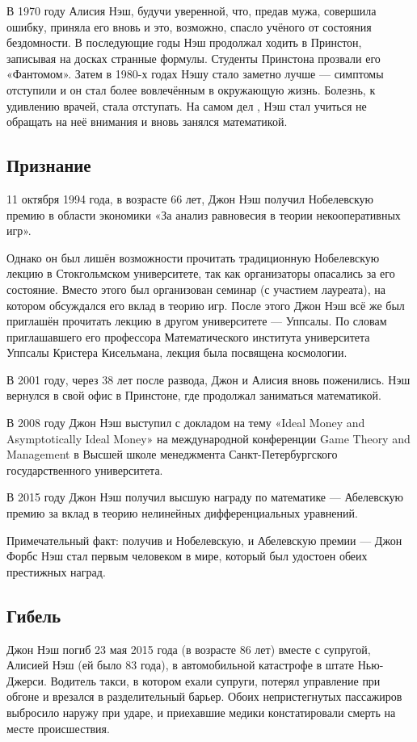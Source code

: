 \documentclass[12pt, a4paper]{article}
\begin{document}
В 1970 году Алисия Нэш, будучи уверенной, что, предав мужа, совершила ошибку,
приняла его вновь и это, возможно, спасло учёного от состояния бездомности. В
последующие годы Нэш продолжал ходить в Принстон, записывая на досках странные
формулы. Студенты Принстона прозвали его «Фантомом». Затем в 1980-х годах
Нэшу стало заметно лучше — симптомы отступили и он стал более вовлечённым в
окружающую жизнь. Болезнь, к удивлению врачей, стала отступать. На самом дел
, Нэш стал учиться не обращать на неё внимания и вновь занялся математикой.

\subsection{Признание}
11 октября 1994 года, в возрасте 66 лет, Джон Нэш получил Нобелевскую премию
в области экономики «За анализ равновесия в теории некооперативных игр».

Однако он был лишён возможности прочитать традиционную Нобелевскую лекцию в
Стокгольмском университете, так как организаторы опасались за его состояние.
Вместо этого был организован семинар (с участием лауреата), на котором
обсуждался его вклад в теорию игр. После этого Джон Нэш всё же был приглашён
прочитать лекцию в другом университете — Уппсалы. По словам приглашавшего
его профессора Математического института университета Уппсалы Кристера
Кисельмана, лекция была посвящена космологии.

В 2001 году, через 38 лет после развода, Джон и Алисия вновь поженились. Нэш
вернулся в свой офис в Принстоне, где продолжал заниматься математикой.

В 2008 году Джон Нэш выступил с докладом на тему «Ideal Money and
Asymptotically Ideal Money» на международной конференции Game Theory and
Management в Высшей школе менеджмента Санкт-Петербургского
государственного университета.

В 2015 году Джон Нэш получил высшую награду по математике — Абелевскую премию
за вклад в теорию нелинейных дифференциальных уравнений.

Примечательный факт: получив и Нобелевскую, и Абелевскую премии — Джон Форбс
Нэш стал первым человеком в мире, который был удостоен обеих престижных наград.

\subsection{Гибель}
Джон Нэш погиб 23 мая 2015 года (в возрасте 86 лет) вместе с супругой,
Алисией Нэш (ей было 83 года), в автомобильной катастрофе в штате Нью-Джерси.
Водитель такси, в котором ехали супруги, потерял управление при обгоне и
врезался в разделительный барьер. Обоих непристегнутых пассажиров выбросило
наружу при ударе, и приехавшие медики констатировали смерть на месте
происшествия.
\end{document}
